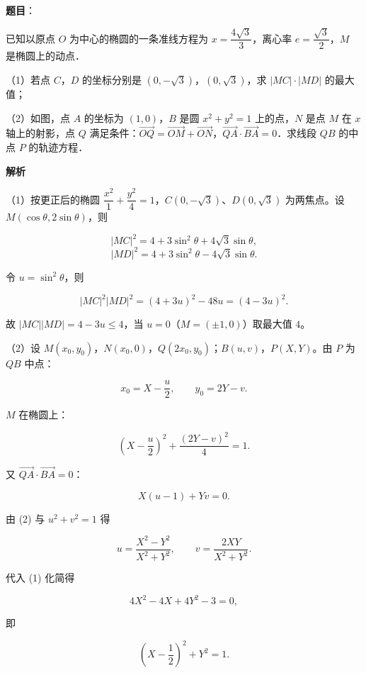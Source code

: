 \begin{answer}

\textbf{题目}：

已知以原点 $O$ 为中心的椭圆的一条准线方程为 $x=\dfrac{4\sqrt3}3$，离心率 $e=\dfrac{\sqrt3}2$，$M$ 是椭圆上的动点．

（1）若点 $C$，$D$ 的坐标分别是 $(0,-\sqrt3)$，$(0,\sqrt3)$，求 $|MC|\cdot|MD|$ 的最大值；

（2）如图，点 $A$ 的坐标为 $(1,0)$，$B$ 是圆 $x^2+y^2=1$ 上的点，$N$ 是点 $M$ 在 $x$ 轴上的射影，点 $Q$ 满足条件：$\overrightarrow{OQ}=\overrightarrow{OM}+\overrightarrow{ON}$，$\overrightarrow{QA}\cdot\overrightarrow{BA}=0$．求线段 $QB$ 的中点 $P$ 的轨迹方程．
\nopagebreak[4]
\begin{center}\end{center}
\nopagebreak[4]
\textbf{解析}

（1）按更正后的椭圆 $\dfrac{x^2}1+\dfrac{y^2}4=1$，$C(0,-\sqrt3)$、$D(0,\sqrt3)$ 为两焦点。设 $M(\cos\theta,2\sin\theta)$，则

\nopagebreak[4]
\[|MC|^2=4+3\sin^2\theta+4\sqrt3\sin\theta,\]
\nopagebreak[4]
\[|MD|^2=4+3\sin^2\theta-4\sqrt3\sin\theta.\]

令 $u=\sin^2\theta$，则

\nopagebreak[4]
\[|MC|^2|MD|^2=(4+3u)^2-48u=(4-3u)^2.\]

故 $|MC||MD|=4-3u\leqslant4$，当 $u=0$（$M=(\pm1,0)$）取最大值 $4$。

（2）设 $M(x_0,y_0)$，$N(x_0,0)$，$Q(2x_0,y_0)$；$B(u,v)$，$P(X,Y)$。由 $P$ 为 $QB$ 中点：

\nopagebreak[4]
\[x_0=X-\frac u2,\qquad y_0=2Y-v.\]

$M$ 在椭圆上：

\nopagebreak[4]
\[\left(X-\frac u2\right)^2+\frac{(2Y-v)^2}{4}=1. \tag{1}\]

又 $\overrightarrow{QA}\cdot\overrightarrow{BA}=0$：

\nopagebreak[4]
\[X(u-1)+Yv=0. \tag{2}\]

由 (2) 与 $u^2+v^2=1$ 得

\nopagebreak[4]
\[u=\frac{X^2-Y^2}{X^2+Y^2},\qquad v=\frac{2XY}{X^2+Y^2}.\]

代入 (1) 化简得

\nopagebreak[4]
\[4X^2-4X+4Y^2-3=0,\]

即

\nopagebreak[4]
\[\left(X-\frac12\right)^2+Y^2=1.\]


\end{answer}

